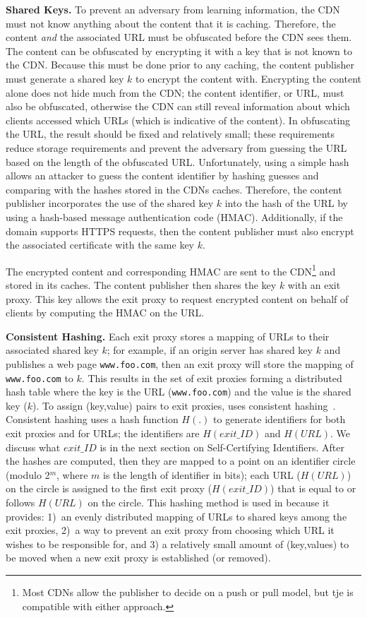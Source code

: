 \textbf{Shared Keys.} 
To prevent an adversary from learning information, the CDN must not know anything
about the
content that it is caching.  Therefore, the content {\it and} the associated URL
must be obfuscated
before the CDN sees them.  The content can be obfuscated by encrypting it with a
key that is not
known to the CDN.  Because this must be done prior to any caching, the content publisher must 
generate a shared key $k$ to encrypt the content with. Encrypting the content alone does not 
hide much from the CDN; the content identifier, or URL, must also be obfuscated, otherwise the 
CDN can still reveal information about which clients accessed which URLs (which is indicative 
of the content).  In obfuscating the URL, the result should be fixed and relatively
small; 
these requirements reduce storage requirements and prevent the adversary from guessing
the
URL based on the length of the obfuscated URL.  Unfortunately, using a simple hash allows an 
attacker to guess the content identifier by hashing guesses and comparing with 
the hashes stored in the CDNs caches.  Therefore, the content publisher incorporates the use 
of the shared key $k$ into the hash of the URL by using a hash-based message authentication code 
(HMAC).  Additionally, if the domain supports HTTPS requests, then the content publisher must 
also encrypt the associated certificate with the same key $k$.

The encrypted content and corresponding HMAC are sent to the CDN\footnote{Most CDNs
allow the publisher to
decide on a push or pull model, but tje \system{} is compatible with either approach.}
and stored in
its caches.  The content publisher then shares the key $k$ with an exit proxy. 
This key allows the 
exit proxy to request encrypted content on behalf of clients by computing the HMAC on the URL.  

\textbf{Consistent Hashing.}
Each exit proxy stores a mapping of URLs to their associated shared key $k$; for example, if 
an origin server has shared key $k$ and publishes a web page {\tt www.foo.com}, then an exit 
proxy will store the mapping of {\tt www.foo.com} to $k$.  This results in the set of exit proxies 
forming a distributed hash table where the key is the URL ({\tt www.foo.com}) and the value is the 
shared key ($k$).  To assign (key,value) pairs to exit proxies, \system{} uses consistent 
hashing~\cite{karger1997consistent,lewin1998consistent}.  Consistent hashing uses a hash function $H(.)$
to generate identifiers for both exit proxies and for URLs; the identifiers are $H(exit\_ID)$ and $H(URL)$. 
We discuss what $exit\_ID$ is in the next section on Self-Certifying Identifiers.  After the hashes are 
computed, then they are mapped to a point on an identifier circle (modulo 2$^{m}$, where $m$ is the length of 
identifier in bits); each URL ($H(URL)$) on the circle is assigned to the first exit proxy ($H(exit\_ID)$) that 
is equal to or follows $H(URL)$ on the circle.  This hashing method is used in \system{} because it provides: 
1)~an evenly distributed mapping of URLs to shared keys among the exit proxies,
2)~a way to prevent an exit 
proxy from choosing which URL it wishes to be responsible for, and 3) a relatively small amount 
of (key,values) to be moved when a new exit proxy is established (or removed).  

